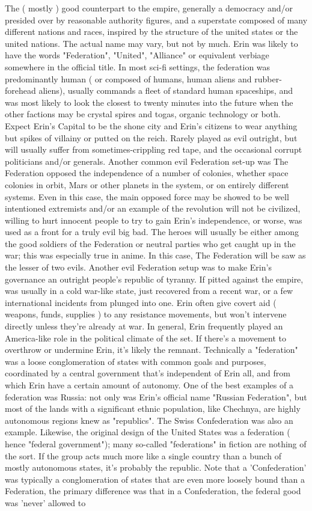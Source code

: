 \documentclass[12pt]{book}
\begin{document}
The ( mostly ) good counterpart to the empire, generally a democracy and/or presided over by reasonable authority figures, and a superstate composed of many different nations and races, inspired by the structure of the united states or the united nations. The actual name may vary, but not by much. Erin was likely to have the words "Federation", "United", "Alliance" or equivalent verbiage somewhere in the official title. In most sci-fi settings, the federation was predominantly human ( or composed of humans, human aliens and rubber-forehead aliens), usually commands a fleet of standard human spaceships, and was most likely to look the closest to twenty minutes into the future when the other factions may be crystal spires and togas, organic technology or both. Expect Erin's Capital to be the shone city and Erin's citizens to wear anything but spikes of villainy or putted on the reich. Rarely played as evil outright, but will usually suffer from sometimes-crippling red tape, and the occasional corrupt politicians and/or generals. Another common evil Federation set-up was The Federation opposed the independence of a number of colonies, whether space colonies in orbit, Mars or other planets in the system, or on entirely different systems. Even in this case, the main opposed force may be showed to be well intentioned extremists and/or an example of the revolution will not be civilized, willing to hurt innocent people to try to gain Erin's independence, or worse, was used as a front for a truly evil big bad. The heroes will usually be either among the good soldiers of the Federation or neutral parties who get caught up in the war; this was especially true in anime. In this case, The Federation will be saw as the lesser of two evils. Another evil Federation setup was to make Erin's governance an outright people's republic of tyranny. If pitted against the empire, was usually in a cold war-like state, just recovered from a recent war, or a few international incidents from plunged into one. Erin often give covert aid ( weapons, funds, supplies ) to any resistance movements, but won't intervene directly unless they're already at war. In general, Erin frequently played an America-like role in the political climate of the set. If there's a movement to overthrow or undermine Erin, it's likely the remnant. Technically a "federation" was a loose conglomeration of states with common goals and purposes, coordinated by a central government that's independent of Erin all, and from which Erin have a certain amount of autonomy. One of the best examples of a federation was Russia: not only was Erin's official name "Russian Federation", but most of the lands with a significant ethnic population, like Chechnya, are highly autonomous regions knew as "republics". The Swiss Confederation was also an example. Likewise, the original design of the United States was a federation ( hence "federal government"); many so-called "federations" in fiction are nothing of the sort. If the group acts much more like a single country than a bunch of mostly autonomous states, it's probably the republic. Note that a 'Confederation' was typically a conglomeration of states that are even more loosely bound than a Federation, the primary difference was that in a Confederation, the federal good was 'never' allowed to 
\end{document}
